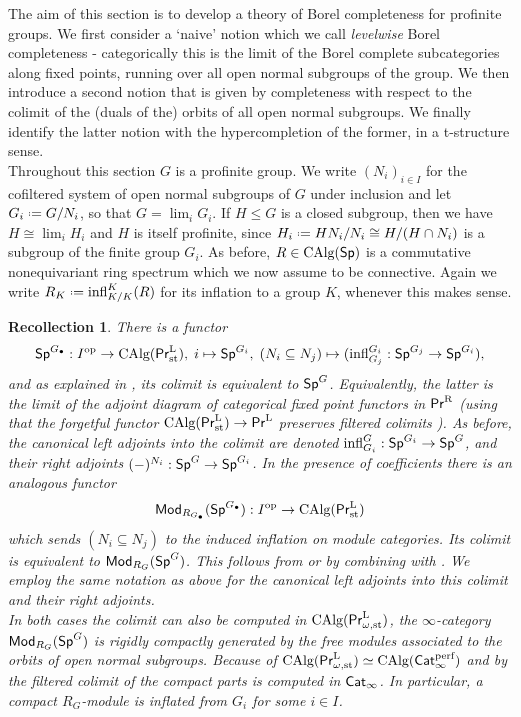 \documentclass[reqno]{amsart}
\numberwithin{equation}{section}\theoremstyle{thms}
\theoremstyle{defn}
\newtheorem{rec}[equation]{Recollection}
\newcommand{\tn}[1]{\textnormal{#1}}
\newcommand{\tsf}[1]{\textsf{\textup{#1}}}
\newcommand*{\defeq}{\mathrel{\vcenter{\baselineskip0.4ex \lineskiplimit0pt
\hbox{\scriptsize.}\hbox{\scriptsize.}}}%
=}
\newcommand{\op}{\tn{op}}
\newcommand{\calg}{\tn{CAlg}}
\newcommand{\Mod}{\tsf{Mod}}
\newcommand{\spec}{\tsf{Sp}}
\newcommand{\specg}{\tsf{Sp}^G}
\newcommand{\catinf}{\tsf{Cat}_{\infty}}
\newcommand{\prl}{\tsf{Pr}^{\tn{L}}}
\newcommand{\prlst}{\tsf{Pr}^{\tn{L}}_{\tn{st}}}
\newcommand{\prr}{\tsf{Pr}^{\tn{R}}}
\begin{document}
The aim of this section is to develop a theory of Borel completeness for profinite groups. We first consider a `naive' notion which we call \emph{levelwise} Borel completeness - categorically this is the limit of the Borel complete subcategories along fixed points, running over all open normal subgroups of the group. We then introduce a second notion that is given by completeness with respect to the colimit of the (duals of the) orbits of all open normal subgroups. We finally identify the latter notion with the hypercompletion of the former, in a t-structure sense. \\
Throughout this section $G$ is a profinite group. We write $(N_i)_{i \in I}$ for the cofiltered system of open normal subgroups of $G$ under inclusion and let $G_i \defeq G/N_i$, so that $G = \lim_i G_i$. If $H \leq G$ is a closed subgroup, then we have $H \cong \lim_i H_i$ and $H$ is itself profinite, since $H_i \defeq HN_i/N_i \cong H/(H \cap N_i)$ is a subgroup of the finite group $G_i$. As before, $R \in \calg(\spec)$ is a commutative nonequivariant ring spectrum which we now assume to be connective. Again we write $R_{K} \defeq \tn{infl}^K_{K/K}(R)$ for its inflation to a group $K$, whenever this makes sense.

\begin{rec}\label{rec:specgascolimit}
There is a functor 
$$\spec^{G_{\bullet}}: I^\op \to \calg(\prlst), \; i \mapsto \spec^{G_i}, \; (N_i \subseteq N_j) \mapsto (\tn{infl}_{G_j}^{G_i}: \spec^{G_j} \to \spec^{G_i}),$$
and as explained in \cite[§6]{bbb24}, \cite[Corollary 5.7]{bt26} its colimit is equivalent to $\specg$. Equivalently, the latter is the limit of the adjoint diagram of categorical fixed point functors in $\prr$ (using that the forgetful functor $\calg(\prlst) \to \prl$ preserves filtered colimits \cite[Remark 4.8.1.24, Corollary 3.2.3.2]{lur17}). As before, the canonical left adjoints into the colimit are denoted $\tn{infl}^G_{G_i}: \spec^{G_i} \to \specg$, and their right adjoints $(-)^{N_i}: \specg \to \spec^{G_i}$. In the presence of coefficients there is an analogous functor
$$\Mod_{R_{G_{\bullet}}}(\spec^{G_{\bullet}}): I^\op \to \calg(\prlst)$$
which sends $(N_i \subseteq N_j)$ to the induced inflation on module categories. Its colimit is equivalent to $\Mod_{R_G}(\specg)$. This follows from \cite[Lemma 3.5.6]{agv22} or by combining \cite[Theorem 5.6]{bt26} with \cite[§14]{bhs23}. We employ the same notation as above for the canonical left adjoints into this colimit and their right adjoints. \\
In both cases the colimit can also be computed in $\calg(\prl_{\omega,\tn{st}})$, the $\infty$-category $\Mod_{R_{G}}(\spec^{G})$ is rigidly compactly generated by the free modules associated to the orbits of open normal subgroups. Because of $\calg(\prl_{\omega,\tn{st}}) \simeq \calg(\catinf^{\tn{perf}})$ and by \cite[Lemma 7.3.5.1]{lur17} the filtered colimit of the compact parts is computed in $\catinf$. In particular, a compact $R_{G}$-module is inflated from $G_i$ for some $i \in I$.
\end{rec}
\end{document}
